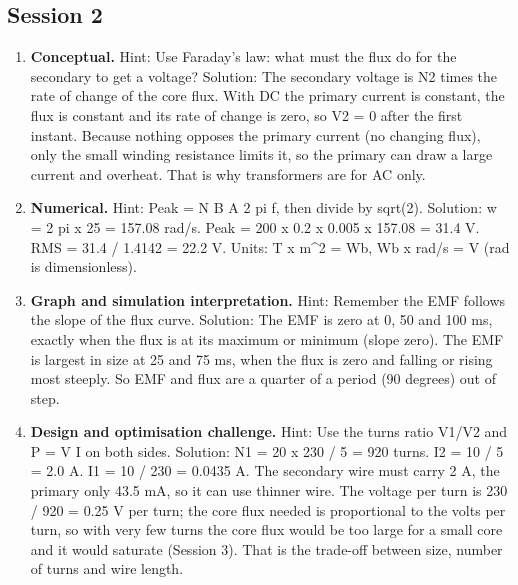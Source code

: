 \documentclass[11pt,a4paper]{article}
\begin{document}
\subsection*{Session 2}
\begin{enumerate}[nosep]
\item \textbf{Conceptual.} Hint: Use Faraday's law: what must the flux do for the secondary to get a voltage? Solution: The secondary voltage is N2 times the rate of change of the core flux. With DC the primary current is constant, the flux is constant and its rate of change is zero, so V2 = 0 after the first instant. Because nothing opposes the primary current (no changing flux), only the small winding resistance limits it, so the primary can draw a large current and overheat. That is why transformers are for AC only.
\item \textbf{Numerical.} Hint: Peak = N B A 2 pi f, then divide by sqrt(2). Solution: w = 2 pi x 25 = 157.08 rad/s. Peak = 200 x 0.2 x 0.005 x 157.08 = 31.4 V. RMS = 31.4 / 1.4142 = 22.2 V. Units: T x m\textasciicircum{}2 = Wb, Wb x rad/s = V (rad is dimensionless).
\item \textbf{Graph and simulation interpretation.} Hint: Remember the EMF follows the slope of the flux curve. Solution: The EMF is zero at 0, 50 and 100 ms, exactly when the flux is at its maximum or minimum (slope zero). The EMF is largest in size at 25 and 75 ms, when the flux is zero and falling or rising most steeply. So EMF and flux are a quarter of a period (90 degrees) out of step.
\item \textbf{Design and optimisation challenge.} Hint: Use the turns ratio V1/V2 and P = V I on both sides. Solution: N1 = 20 x 230 / 5 = 920 turns. I2 = 10 / 5 = 2.0 A. I1 = 10 / 230 = 0.0435 A. The secondary wire must carry 2 A, the primary only 43.5 mA, so it can use thinner wire. The voltage per turn is 230 / 920 = 0.25 V per turn; the core flux needed is proportional to the volts per turn, so with very few turns the core flux would be too large for a small core and it would saturate (Session 3). That is the trade-off between size, number of turns and wire length.
\end{enumerate}
\end{document}

